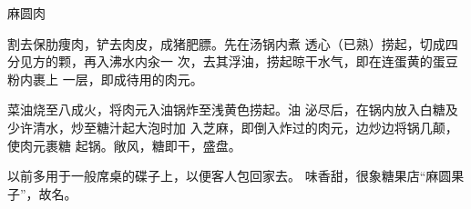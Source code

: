 \begin{recipe}{麻圆肉}

\ingredients


\cooking

\step 	割去保肋痩肉，铲去肉皮，成猪肥膘。先在汤锅内煮 透心（已熟）捞起，切成四分见方的颗，再入沸水内汆一 次，去其浮油，捞起晾干水气，即在连蛋黄的蛋豆粉内裹上 一层，即成待用的肉元。

\step 	菜油烧至八成火，将肉元入油锅炸至浅黄色捞起。油 泌尽后，在锅内放入白糖及少许清水，炒至糖汁起大泡时加 入芝麻，即倒入炸过的肉元，边炒边将锅几颠，使肉元裹糖 起锅。敞风，糖即干，盛盘。

\notes

以前多用于一般席桌的碟子上，以便客人包回家去。 味香甜，很象糖果店“麻圆果子”，故名。

\end{recipe}

